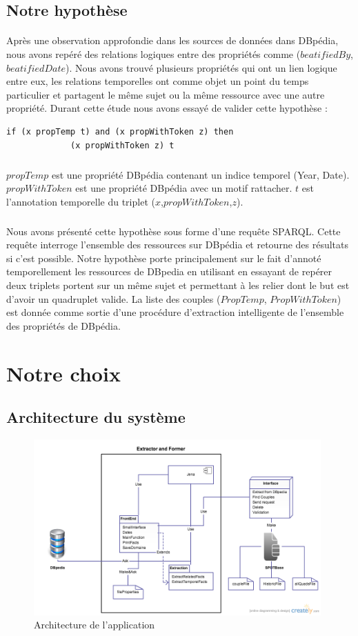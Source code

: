 \subsection{Notre hypothèse}
\paragraph{}
Après une observation approfondie dans les sources de données dans DBpédia, nous avons repéré des relations logiques entre des propriétés comme ($beatifiedBy$, $beatifiedDate$). Nous avons trouvé plusieurs propriétés qui ont un lien logique entre eux, les relations temporelles ont comme objet un point du temps particulier et partagent le même sujet ou la même ressource avec une autre propriété.
Durant cette étude nous avons essayé de valider cette hypothèse :

\begin{verbatim}
if (x propTemp t) and (x propWithToken z) then
             (x propWithToken z) t 
\end{verbatim}

\subparagraph{}

$propTemp$ est une propriété DBpédia contenant un indice temporel (Year, Date).
\newline
$propWithToken$ est une propriété DBpédia avec un motif rattacher.
\newline
$t$ est l'annotation temporelle du triplet ($x$,$propWithToken$,$z$).

\subparagraph{}
Nous avons présenté cette hypothèse sous forme d'une requête SPARQL. Cette requête interroge l'ensemble des ressources sur DBpédia et retourne des résultats si c'est possible.
Notre hypothèse porte principalement sur le fait d'annoté temporellement les ressources de DBpedia en utilisant en essayant de repérer deux triplets portent sur un même sujet et permettant à les relier dont le but est d'avoir un quadruplet valide. La liste des couples ($PropTemp$, $PropWithToken$)
est donnée comme sortie d'une procédure d'extraction intelligente de l'ensemble des propriétés de DBpédia.
\section{Notre choix}
\subsection{Architecture du système}
 \begin{figure}[H]
        \centering
                \includegraphics[width=11cm]{Architecture.png}
               \caption{Architecture de l'application}
\end{figure}
